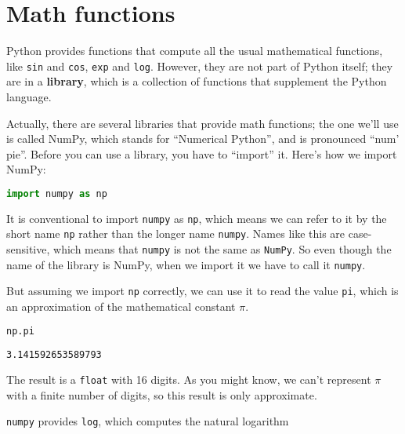 \hypertarget{math-functions}{%
\section{Math functions}\label{math-functions}}

Python provides functions that compute all the usual mathematical
functions, like \passthrough{\lstinline!sin!} and
\passthrough{\lstinline!cos!}, \passthrough{\lstinline!exp!} and
\passthrough{\lstinline!log!}. However, they are not part of Python
itself; they are in a \textbf{library}, which is a collection of
functions that supplement the Python language.

Actually, there are several libraries that provide math functions; the
one we'll use is called NumPy, which stands for ``Numerical Python'',
and is pronounced ``num' pie''. Before you can use a library, you have
to ``import'' it. Here's how we import NumPy:

\begin{lstlisting}[language=Python,style=source]
import numpy as np
\end{lstlisting}

It is conventional to import \passthrough{\lstinline!numpy!} as
\passthrough{\lstinline!np!}, which means we can refer to it by the
short name \passthrough{\lstinline!np!} rather than the longer name
\passthrough{\lstinline!numpy!}. Names like this are case-sensitive,
which means that \passthrough{\lstinline!numpy!} is not the same as
\passthrough{\lstinline!NumPy!}. So even though the name of the library
is NumPy, when we import it we have to call it
\passthrough{\lstinline!numpy!}.

But assuming we import \passthrough{\lstinline!np!} correctly, we can
use it to read the value \passthrough{\lstinline!pi!}, which is an
approximation of the mathematical constant \(\pi\).

\begin{lstlisting}[language=Python,style=source]
np.pi
\end{lstlisting}

\begin{lstlisting}[style=output]
3.141592653589793
\end{lstlisting}

The result is a \passthrough{\lstinline!float!} with 16 digits. As you
might know, we can't represent \(\pi\) with a finite number of digits,
so this result is only approximate.

\passthrough{\lstinline!numpy!} provides \passthrough{\lstinline!log!},
which computes the natural logarithm

